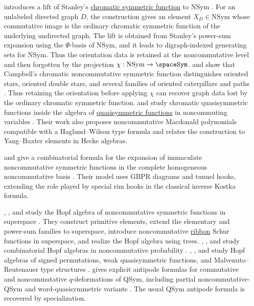  introduces a lift of Stanley's
\hyperref[chromaticSymmetricFunction]{chromatic symmetric function} to
$\mathrm{NSym}$ \cite{Campbell2024x}.  For an unlabeled directed graph $D$,
the construction gives an element $X_D\in \mathrm{NSym}$ whose commutative
image is the ordinary chromatic symmetric function of the underlying
undirected graph.  The lift is obtained from Stanley's power-sum expansion
using the $\Psi$-basis of $\mathrm{NSym}$, and it leads to
digraph-indexed generating sets for $\mathrm{NSym}$.  Thus the orientation
data is retained at the noncommutative level and then forgotten by the
projection $\chi:\mathrm{NSym}\to\spaceSym$.
 and  show that Campbell's chromatic
noncommutative symmetric function distinguishes oriented stars, oriented
double stars, and several families of oriented caterpillars and paths
\cite{HaoZhu2026x}.  Thus retaining the orientation before applying $\chi$
can recover graph data lost by the ordinary chromatic symmetric function.
 and
 study chromatic quasisymmetric
functions inside the algebra of \hyperref[quasiSymmetricFunctions]
{quasisymmetric functions} in noncommuting variables
\cite{NovelliThibon2025x}.  Their work also proposes
noncommutative Macdonald polynomials compatible with a Haglund--Wilson type
formula and relates the construction to Yang--Baxter elements in Hecke
algebras.

 and  give a combinatorial
formula for the expansion of immaculate noncommutative symmetric functions in
the complete homogeneous noncommutative basis \cite{AllenMason2025}.  Their
model uses GBPR diagrams and tunnel hooks, extending the role played by special
rim hooks in the classical inverse Kostka formula.

, , and
 study the Hopf algebra of noncommutative
symmetric functions in superspace \cite{ArcisGonzalezMarquez2024}.  They
construct primitive elements, extend the elementary and power-sum families to
superspace, introduce noncommutative \hyperref[ribbonDefinition]{ribbon} Schur
functions in superspace, and realize the Hopf algebra using trees.
, , and
 study combinatorial Hopf algebras in
noncommutative probability \cite{LehnerNovelliThibon2020x}.
, , and  study Hopf
algebras of signed permutations, weak quasisymmetric functions, and
Malvenuto--Reutenauer type structures \cite{GuoThibonYu2020}.
 gives explicit antipode formulas for commutative and
noncommutative $q$-deformations of QSym, including partial
noncommutative-QSym and word-quasisymmetric variants \cite{Zemel2026x}.
The usual QSym antipode formula is recovered by specialization.

